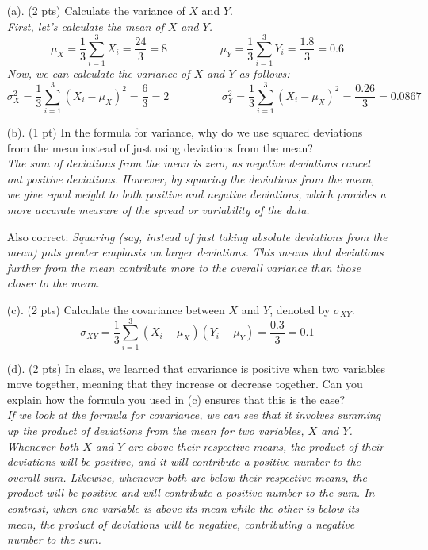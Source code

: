 \documentclass{./../../Latex/tests}
\begin{document}
\begin{enumerate}
\item[(a).] (2 pts) Calculate the variance of $X$ and $Y$. \\

\textit{First, let's calculate the mean of $X$ and $Y$. $$ \mu_X = \frac{1}{3} \sum_{i=1}^3 X_i = \frac{24}{3} = 8  \hspace{2cm} \mu_Y = \frac{1}{3} \sum_{i=1}^3 Y_i = \frac{1.8}{3} = 0.6 $$
Now, we can calculate the variance of $X$ and $Y$ as follows:
$$ \sigma^2_X = \frac{1}{3} \sum_{i=1}^3 (X_i-\mu_X)^2 = \frac{6}{3} =2  \hspace{2cm} \sigma^2_Y = \frac{1}{3} \sum_{i=1}^3 (X_i-\mu_X)^2 =  \frac{0.26}{3} =0.0867 $$
}
\item[(b).] (1 pt) In the formula for variance, why do we use squared deviations from the mean instead of just using deviations from the mean? \\

\textit{The sum of deviations from the mean is zero, as negative deviations cancel out positive deviations. However, by squaring the deviations from the mean, we give equal weight to both positive and negative deviations, which provides a more accurate measure of the spread or variability of the data.}

Also correct: \textit{Squaring (say, instead of just taking absolute deviations from the mean) puts greater emphasis on larger deviations. This means that deviations further from the mean contribute more to the overall variance than those closer to the mean.}

\item[(c).] (2 pts) Calculate the covariance between $X$ and $Y$, denoted by $\sigma_{XY}$. 
$$ \sigma_{XY} = \frac{1}{3} \sum_{i=1}^3 (X_i-\mu_X) (Y_i-\mu_Y) = \frac{0.3}{3} = 0.1 $$

\item[(d).] (2 pts) In class, we learned that covariance is positive when two variables move together, meaning that they increase or decrease together. Can you explain how the formula you used in (c) ensures that this is the case? \\

\textit{If we look at the formula for covariance, we can see that it involves summing up the product of deviations from the mean for two variables, $X$ and $Y$. Whenever both $X$ and $Y$ are above their respective means, the product of their deviations will be positive, and it will contribute a positive number to the overall sum. Likewise, whenever both are below their respective means, the product will be positive and will contribute a positive number to the sum. In contrast, when one variable is above its mean while the other is below its mean, the product of deviations will be negative, contributing a negative number to the sum.}


\end{enumerate}
\end{document}
